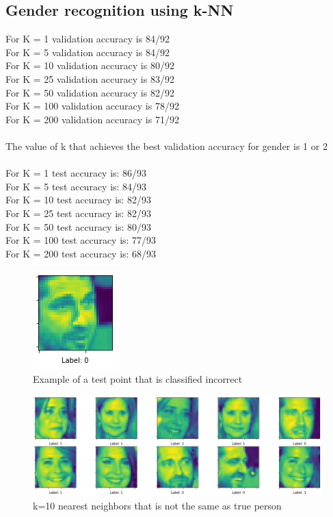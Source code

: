 \documentclass{article}
\begin{document}
\subsection{Gender recognition using k-NN}
For K = 1 validation accuracy is 84/92\\
For K = 5 validation accuracy is 84/92\\
For K = 10 validation accuracy is 80/92\\
For K = 25 validation accuracy is 83/92\\
For K = 50 validation accuracy is 82/92\\
For K = 100 validation accuracy is 78/92\\
For K = 200  validation accuracy is 71/92\\\\
The value of k that achieves the best validation accuracy for gender is 1 or 2\\\\
For K = 1 test accuracy is: 86/93\\
For K = 5  test accuracy is: 84/93\\
For K = 10  test accuracy is: 82/93\\
For K = 25  test accuracy is: 82/93\\
For K = 50  test accuracy is: 80/93\\
For K = 100  test accuracy is: 77/93\\
For K = 200  test accuracy is: 68/93\\

\begin{figure}
    \caption{Example of a test point that is classified incorrect}
    \centering
        \includegraphics[scale=0.6]{7.png}
\end{figure}

\begin{figure}
    \caption{k=10 nearest neighbors that is not the same as true person}
    \centering
        \includegraphics[scale=0.6]{8.png}
\end{figure}
\end{document}
